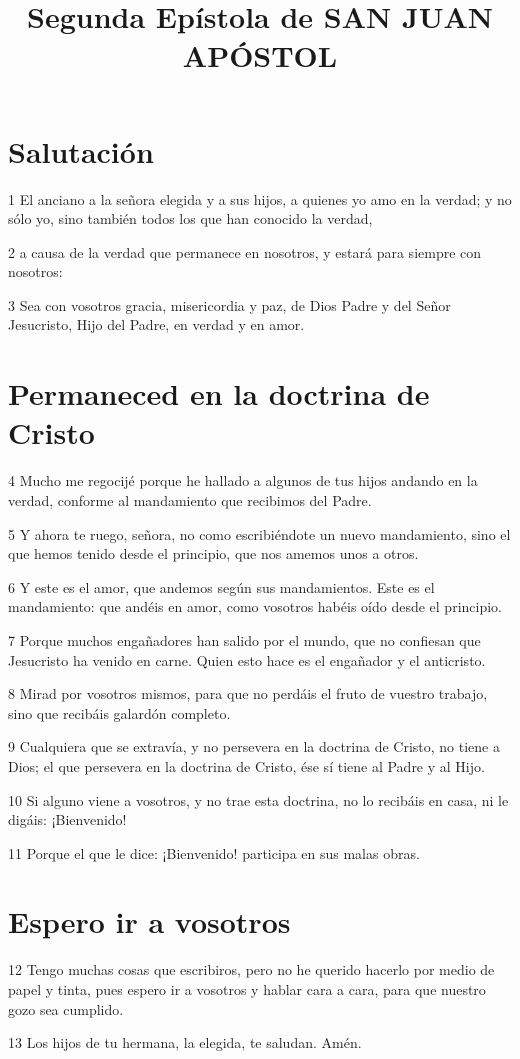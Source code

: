 
\title{Segunda Epístola de SAN JUAN APÓSTOL}

\section*{Salutación}

\par 1 El anciano a la señora elegida y a sus hijos, a quienes yo amo en la verdad; y no sólo yo, sino también todos los que han conocido la verdad,
\par 2 a causa de la verdad que permanece en nosotros, y estará para siempre con nosotros:
\par 3 Sea con vosotros gracia, misericordia y paz, de Dios Padre y del Señor Jesucristo, Hijo del Padre, en verdad y en amor.

\section*{Permaneced en la doctrina de Cristo}

\par 4 Mucho me regocijé porque he hallado a algunos de tus hijos andando en la verdad, conforme al mandamiento que recibimos del Padre.
\par 5 Y ahora te ruego, señora, no como escribiéndote un nuevo mandamiento, sino el que hemos tenido desde el principio, que nos amemos unos a otros.
\par 6 Y este es el amor, que andemos según sus mandamientos. Este es el mandamiento: que andéis en amor, como vosotros habéis oído desde el principio.
\par 7 Porque muchos engañadores han salido por el mundo, que no confiesan que Jesucristo ha venido en carne. Quien esto hace es el engañador y el anticristo.
\par 8 Mirad por vosotros mismos, para que no perdáis el fruto de vuestro trabajo, sino que recibáis galardón completo.
\par 9 Cualquiera que se extravía, y no persevera en la doctrina de Cristo, no tiene a Dios; el que persevera en la doctrina de Cristo, ése sí tiene al Padre y al Hijo.
\par 10 Si alguno viene a vosotros, y no trae esta doctrina, no lo recibáis en casa, ni le digáis: ¡Bienvenido!
\par 11 Porque el que le dice: ¡Bienvenido! participa en sus malas obras.

\section*{Espero ir a vosotros}

\par 12 Tengo muchas cosas que escribiros, pero no he querido hacerlo por medio de papel y tinta, pues espero ir a vosotros y hablar cara a cara, para que nuestro gozo sea cumplido.
\par 13 Los hijos de tu hermana, la elegida, te saludan. Amén.

